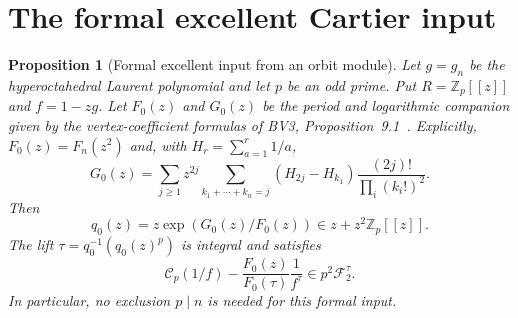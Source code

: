 \documentclass[11pt,a4paper]{article}
\newtheorem{proposition}[theorem]{Proposition}
\theoremstyle{definition}\newtheorem{definition}[theorem]{Definition}
\theoremstyle{remark}\newtheorem{remark}[theorem]{Remark}
\numberwithin{equation}{section}
\begin{document}
\section{The formal excellent Cartier input}\label{AP:source-main-2}\label{AP:sec:formal-input}
\begin{proposition}[Formal excellent input from an orbit module]\label{AP:prop:orbit}
Let $g=g_n$ be the hyperoctahedral Laurent polynomial and let $p$ be an odd prime.
Put $R=\mathbb Z_p[[z]]$ and $f=1-zg$.
Let $F_0(z)$ and $G_0(z)$ be the period and logarithmic companion
given by the vertex-coefficient formulas of BV3, Proposition~9.1~\cite{BV3}.
Explicitly, $F_0(z)=F_n(z^2)$ and, with $H_r=\sum_{a=1}^r1/a$,
\[
 G_0(z)=\sum_{j\ge1}z^{2j}
 \sum_{k_1+\cdots+k_n=j}
 (H_{2j}-H_{k_1})\frac{(2j)!}{\prod_i(k_i!)^2}.
\]
Then
\[
 q_0(z)=z\exp(G_0(z)/F_0(z))\in z+z^2\mathbb Z_p[[z]].
\]
The lift $\tau=q_0^{-1}(q_0(z)^p)$ is integral and satisfies
\[
 \mathscr C_p(1/f)-\frac{F_0(z)}{F_0(\tau)}\frac1{f^\tau}
 \in p^2\mathscr F_2^\tau.
\]
In particular, no exclusion $p\mid n$ is needed for this formal input.
\end{proposition}
\end{document}
